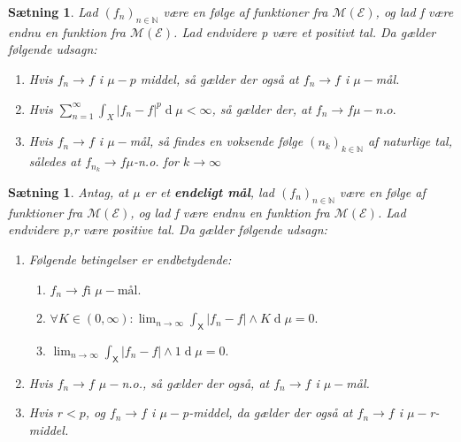 \documentclass{article}
\newcommand{\N}{\mathbb{N}}
\newcommand{\1}{\mathbbm{1}}
\newcommand{\X}{\mathsf{X}}
\newcommand{\deriv}{\operatorname{d}}
\newtheorem{proposition}[theorem]{Sætning}
\theoremstyle{boxed}
\begin{document}
\begin{theorem-box}
    \begin{proposition}
        Lad $(f_n)_{n\in\N}$ være en følge af funktioner fra $\mathcal{M}(\mathcal{E})$, og lad f være endnu en funktion fra $\mathcal{M}(\mathcal{E})$. Lad endvidere p være et positivt tal. Da gælder følgende udsagn:
        \begin{enumerate}
            \item[\textnormal{(i)}] Hvis $f_n\rightarrow f$ i $\mu-p$ middel, så gælder der også at $f_n\rightarrow f$ i $\mu-$mål.
            \item[\textnormal{(ii)}] Hvis $\sum_{n=1}^\infty\int_X|f_n-f|^p\deriv\mu<\infty$, så gælder der, at $f_n\rightarrow f \mu-n.o.$
            \item[\textnormal{(iii)}] Hvis $f_n\rightarrow f$ i $\mu-$mål, så findes en voksende følge $(n_k)_{k\in\N}$ af naturlige tal, således at $f_{n_k}\rightarrow f \mu$-n.o. for $k\rightarrow \infty$ 
        \end{enumerate}
    \end{proposition}
\end{theorem-box}
\begin{theorem-box}
    \begin{proposition}
        Antag, at $\mu$ er et \textbf{endeligt mål}, lad $(f_n)_{n\in\N}$ være en følge af funktioner fra $\mathcal{M}(\mathcal{E})$, og lad f være endnu en funktion fra $\mathcal{M}(\mathcal{E})$. Lad endvidere p,r være positive tal. Da gælder følgende udsagn:
        \begin{enumerate}
            \item[\textnormal{(i)}] Følgende betingelser er endbetydende:
            \begin{enumerate}
                \item[\textnormal{(i1)}] $f_n \rightarrow f \text{i }\mu-\text{mål}.$
                \item[\textnormal{(i2)}] $\forall K\in(0,\infty):\lim_{n\rightarrow\infty}\int_\X|f_n-f| \wedge K \deriv \mu = 0.$
                \item[\textnormal{(i3)}] $\lim_{n\rightarrow \infty}\int_{\X}|f_n-f|\wedge 1 \deriv \mu = 0.$ 
            \end{enumerate}
            \item[\textnormal{(ii)}] Hvis $f_n\rightarrow f$ $\mu-$n.o., så gælder der også, at $f_n\rightarrow f$ i $\mu-$mål.
            \item[\textnormal{(iii)}] Hvis $r<p$, og $f_n\rightarrow f$ i $\mu-$p-middel, da gælder der også at $f_n\rightarrow f$ i $\mu-$r-middel.
            \end{enumerate}
    \end{proposition}
\end{theorem-box}
\end{document}
